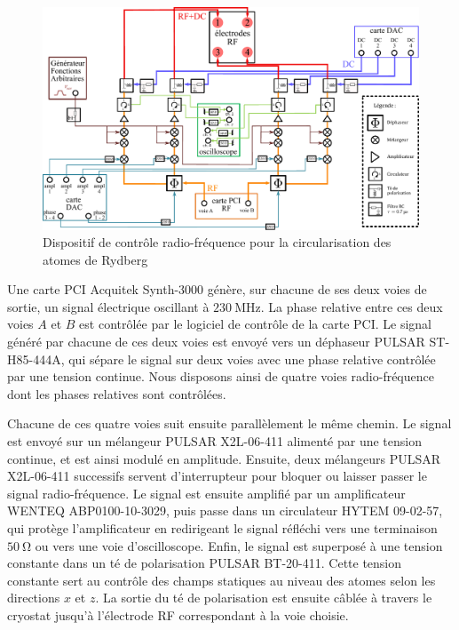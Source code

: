\begin{figure}
\centering
\includegraphics[width=\linewidth]{figures/circulars/RF_control}
\caption[Dispositif de contrôle radio-fréquence]
{Dispositif de contrôle radio-fréquence pour la circularisation des atomes de Rydberg}
\label{fig:RF_control}
\end{figure}

Une carte PCI Acquitek Synth-3000 génère, sur chacune de ses deux voies de sortie, un signal électrique oscillant à $\SI{230}{\MHz}$.
La phase relative entre ces deux voies $A$ et $B$ est contrôlée par le logiciel de contrôle de la carte PCI.
Le signal généré par chacune de ces deux voies est envoyé vers un déphaseur PULSAR ST-H85-444A, qui sépare le signal sur deux voies avec une phase relative contrôlée par une tension continue.
Nous disposons ainsi de quatre voies radio-fréquence dont les phases relatives sont contrôlées.

Chacune de ces quatre voies suit ensuite parallèlement le même chemin.
Le signal est envoyé sur un mélangeur PULSAR X2L-06-411 alimenté par une tension continue, et est ainsi modulé en amplitude.
Ensuite, deux mélangeurs PULSAR X2L-06-411 successifs servent d'interrupteur pour bloquer ou laisser passer le signal radio-fréquence.
Le signal est ensuite amplifié par un amplificateur WENTEQ ABP0100-10-3029, puis passe dans un circulateur HYTEM 09-02-57, qui protège l'amplificateur en redirigeant le signal réfléchi vers une terminaison $\SI{50}{\ohm}$ ou vers une voie d'oscilloscope.
Enfin, le signal est superposé à une tension constante dans un té de polarisation PULSAR BT-20-411.
Cette tension constante sert au contrôle des champs statiques au niveau des atomes selon les directions $x$ et $z$.
La sortie du té de polarisation est ensuite câblée à travers le cryostat jusqu'à l'électrode RF correspondant à la voie choisie.

